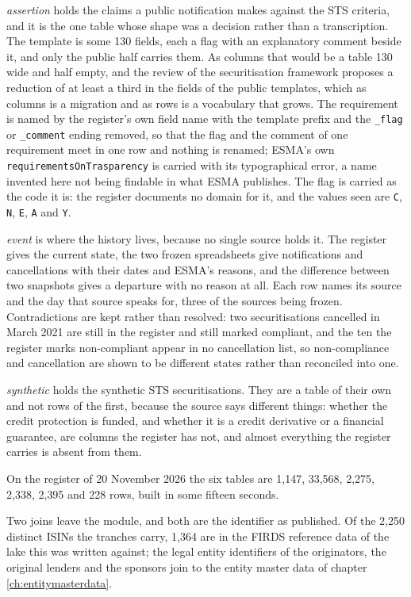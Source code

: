 \emph{assertion} holds the claims a public notification makes against the STS criteria, and it is the one table whose shape was a decision rather than a transcription. The template is some 130 fields, each a flag with an explanatory comment beside it, and only the public half carries them. As columns that would be a table 130 wide and half empty, and the review of the securitisation framework proposes a reduction of at least a third in the fields of the public templates, which as columns is a migration and as rows is a vocabulary that grows. The requirement is named by the register's own field name with the template prefix and the \verb|_flag| or \verb|_comment| ending removed, so that the flag and the comment of one requirement meet in one row and nothing is renamed; ESMA's own \verb|requirementsOnTrasparency| is carried with its typographical error, a name invented here not being findable in what ESMA publishes. The flag is carried as the code it is: the register documents no domain for it, and the values seen are \verb|C|, \verb|N|, \verb|E|, \verb|A| and \verb|Y|.

\emph{event} is where the history lives, because no single source holds it. The register gives the current state, the two frozen spreadsheets give notifications and cancellations with their dates and ESMA's reasons, and the difference between two snapshots gives a departure with no reason at all. Each row names its source and the day that source speaks for, three of the sources being frozen. Contradictions are kept rather than resolved: two securitisations cancelled in March 2021 are still in the register and still marked compliant, and the ten the register marks non-compliant appear in no cancellation list, so non-compliance and cancellation are shown to be different states rather than reconciled into one.

\emph{synthetic} holds the synthetic STS securitisations. They are a table of their own and not rows of the first, because the source says different things: whether the credit protection is funded, and whether it is a credit derivative or a financial guarantee, are columns the register has not, and almost everything the register carries is absent from them.

On the register of 20 November 2026 the six tables are 1{,}147, 33{,}568, 2{,}275, 2{,}338, 2{,}395 and 228 rows, built in some fifteen seconds.

Two joins leave the module, and both are the identifier as published. Of the 2{,}250 distinct ISINs the tranches carry, 1{,}364 are in the FIRDS reference data of the lake this was written against; the legal entity identifiers of the originators, the original lenders and the sponsors join to the entity master data of chapter \ref{ch:entitymasterdata}.


